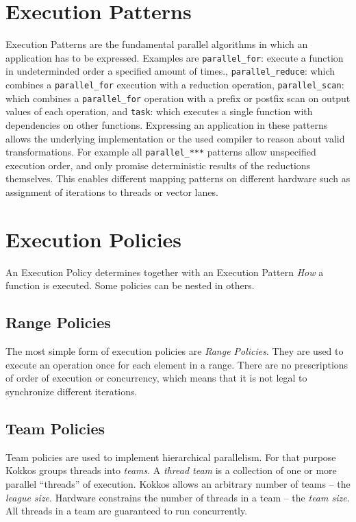 \section{Execution Patterns}

Execution Patterns are the fundamental parallel algorithms in which an application has to be expressed.
Examples are \lstinline|parallel_for|: execute a function in undeterminded order a specified amount of times.,
\lstinline|parallel_reduce|: which combines a \lstinline|parallel_for| execution with a reduction operation,
\lstinline|parallel_scan|: which combines a \lstinline|parallel_for| operation with a prefix or postfix scan on output values of each operation, and
\lstinline|task|: which executes a single function with dependencies on other functions.
Expressing an application in these patterns allows the underlying implementation or the used compiler to reason about valid transformations.
For example all \lstinline|parallel_***| patterns allow unspecified execution order, and only promise deterministic results of the reductions themselves.
This enables different mapping patterns on different hardware such as assignment of iterations to threads or vector lanes. 

\section{Execution Policies}

An Execution Policy determines together with an Execution Pattern {\it How} a function is executed.
Some policies can be nested in others.

\subsection{Range Policies}

The most simple form of execution policies are {\it Range Policies}. 
They are used to execute an operation once for each element in a range. 
There are no prescriptions of order of execution or concurrency, which means that it is not legal
to synchronize different iterations. 

\subsection{Team Policies}

Team policies are used to implement hierarchical parallelism. 
For that purpose Kokkos groups threads into \emph{teams}.
A \emph{thread team} is a collection of one or more parallel ``threads'' of execution.
Kokkos allows an arbitrary number of teams -- the \emph{league size}.
Hardware constrains the number of threads in a team -- the \emph{team size}.
All threads in a team are guaranteed to run concurrently. 

